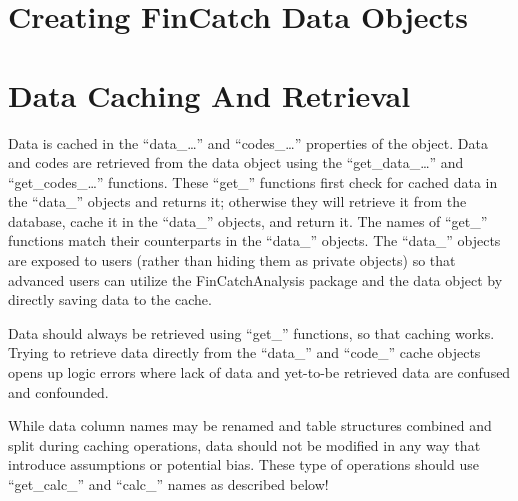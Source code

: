 \documentclass[
  letterpaper,
  DIV=11,
  numbers=noendperiod]{scrreprt}
\begin{document}
\section{Creating FinCatch Data
Objects}\label{creating-fincatch-data-objects}

\section{Data Caching And Retrieval}\label{data-caching-and-retrieval}

Data is cached in the ``data\_\ldots{}'' and ``codes\_\ldots{}''
properties of the object. Data and codes are retrieved from the data
object using the ``get\_data\_\ldots{}'' and ``get\_codes\_\ldots{}''
functions. These ``get\_'' functions first check for cached data in the
``data\_'' objects and returns it; otherwise they will retrieve it from
the database, cache it in the ``data\_'' objects, and return it. The
names of ``get\_'' functions match their counterparts in the ``data\_''
objects. The ``data\_'' objects are exposed to users (rather than hiding
them as private objects) so that advanced users can utilize the
FinCatchAnalysis package and the data object by directly saving data to
the cache.

\begin{tcolorbox}[enhanced jigsaw, leftrule=.75mm, coltitle=black, colbacktitle=quarto-callout-important-color!10!white, colframe=quarto-callout-important-color-frame, opacitybacktitle=0.6, rightrule=.15mm, colback=white, bottomtitle=1mm, toptitle=1mm, titlerule=0mm, breakable, bottomrule=.15mm, toprule=.15mm, title=\textcolor{quarto-callout-important-color}{\faExclamation}\hspace{0.5em}{Retrieving Data}, arc=.35mm, opacityback=0, left=2mm]

Data should always be retrieved using ``get\_'' functions, so that
caching works. Trying to retrieve data directly from the ``data\_'' and
``code\_'' cache objects opens up logic errors where lack of data and
yet-to-be retrieved data are confused and confounded.

\end{tcolorbox}

\begin{tcolorbox}[enhanced jigsaw, leftrule=.75mm, coltitle=black, colbacktitle=quarto-callout-caution-color!10!white, colframe=quarto-callout-caution-color-frame, opacitybacktitle=0.6, rightrule=.15mm, colback=white, bottomtitle=1mm, toptitle=1mm, titlerule=0mm, breakable, bottomrule=.15mm, toprule=.15mm, title=\textcolor{quarto-callout-caution-color}{\faFire}\hspace{0.5em}{Caution}, arc=.35mm, opacityback=0, left=2mm]

While data column names may be renamed and table structures combined and
split during caching operations, data should not be modified in any way
that introduce assumptions or potential bias. These type of operations
should use ``get\_calc\_'' and ``calc\_'' names as described below!

\end{tcolorbox}
\end{document}
